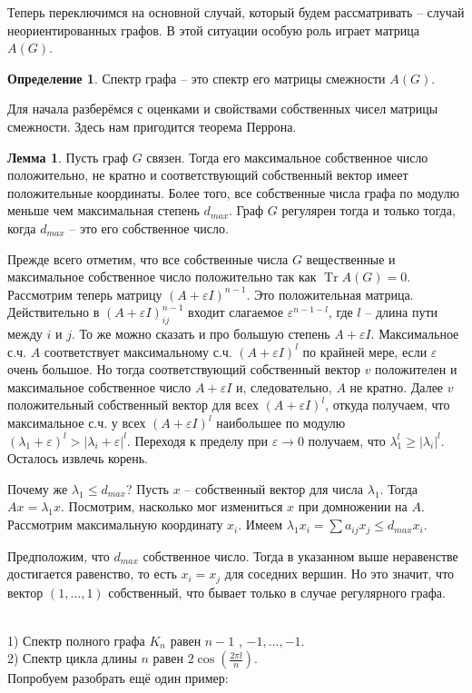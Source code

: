 \documentclass[10pt,a4paper,oneside]{book}
\theoremstyle{definition}
\newtheorem*{defn}{Определение}
\newtheorem{lem}{Лемма}
\newcommand{\Tr}{\operatorname{Tr}}
\def\exm{\noindent {\bf Примеры:}}
\def\eps{\varepsilon}
\def\dfn{\begin{defn}}
\def\edfn{\end{defn}}
\def\lm{\begin{lem}}
\def\elm{\end{lem}}
\begin{document}
Теперь переключимся на основной случай, который будем рассматривать -- случай неориентированных графов. В этой ситуации особую роль играет матрица $A(G)$.


\dfn Спектр графа -- это спектр его матрицы смежности $A(G)$.
\edfn


Для начала разберёмся с оценками и свойствами собственных чисел матрицы смежности. Здесь нам пригодится теорема Перрона. 


\lm Пусть граф $G$ связен. Тогда его максимальное собственное число положительно, не кратно и соответствующий собственный вектор имеет положительные координаты. Более того, все собственные числа графа по модулю меньше чем максимальная степень $d_{max}$. Граф $G$ регулярен тогда и только тогда, когда $d_{max}$ -- это его собственное число.
\elm
\proof Прежде всего отметим, что все собственные числа $G$ вещественные и максимальное собственное число положительно так как $\Tr A(G)=0$. Рассмотрим теперь матрицу $(A+\eps I)^{n-1}$. Это положительная матрица. Действительно в $(A+\eps I)^{n-1}_{ij}$ входит слагаемое $\eps^{n-1-l}$, где $l$ -- длина пути между $i$ и $j$. То же можно сказать и про большую степень $A+\eps I$. Максимальное с.ч. $A$ соответствует максимальному с.ч. $(A+\eps I)^l$ по крайней мере, если $\eps$ очень большое. Но тогда соответствующий собственный вектор $v$ положителен и максимальное собственное число $A+\eps I$ и, следовательно, $A$ не кратно. Далее $v$ положительный собственный вектор для всех $(A+\eps I)^{l}$, откуда получаем, что максимальное с.ч. у всех $(A+\eps I)^{l}$ наибольшее по модулю $(\lambda_1+\eps)^l>|\lambda_i+\eps|^l$. Переходя к пределу при $\eps \to 0$ получаем, что $\lambda_1^l \geq |\lambda_i|^l$. Осталось извлечь корень.

Почему же $\lambda_1 \leq d_{max}$? Пусть $x$ -- собственный вектор для числа $\lambda_1$. Тогда $Ax=\lambda_1 x$. Посмотрим, насколько мог измениться $x$ при домножении на $A$. Рассмотрим максимальную координату $x_i$. Имеем $\lambda_1 x_i= \sum a_{ij}x_j\leq d_{max} x_i$.

Предположим, что $d_{max}$ собственное число. Тогда в указанном выше неравенстве достигается равенство, то есть $x_i=x_j$ для соседних вершин. Но это значит, что вектор $(1,\dots,1)$ собственный, что бывает только в случае регулярного графа. 
\endproof


\exm \\
1) Спектр полного графа $K_n$ равен $n-1$ , $-1, \dots,-1$.\\
2) Спектр цикла длины $n$ равен $2\cos(\frac{2\pi l}{n})$.\\
Попробуем разобрать ещё один пример:
\end{document}
